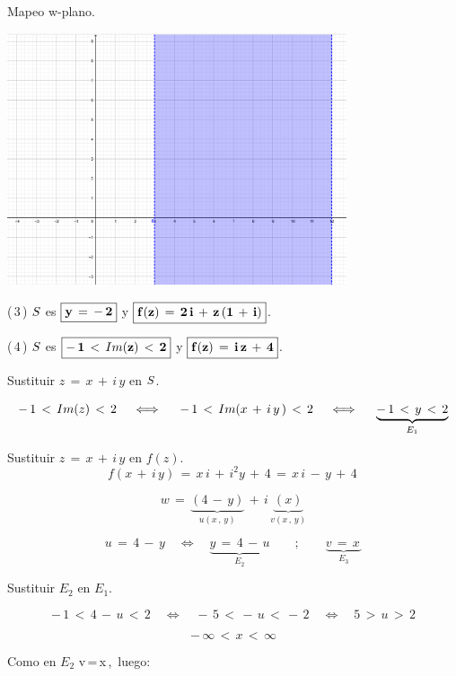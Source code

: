 \documentclass[a4paper,11pt,openany]{book}
\begin{document}
\textcolor{ao(english)}{} Mapeo w-plano.

\begin{center}
     \includegraphics[width=10cm]{Mapeo-Ej-2-w}
\end{center}

\textcolor{ao(english)}{(\,3\,)} $\mathnormal{S}$ es $\boxed{\bf{y\,=\,-\,2}}$ y $\boxed{\bf{f(z)\,=\,2\,i\,+\,z\,(1\,+\,i)}}$.

\textcolor{ao(english)}{(\,4\,)} $\mathnormal{S}$ es $\boxed{\bf{-\,1\,<\,\mathnormal{Im}(z)\,<\,2}}$ y $\boxed{\bf{f(z)\,=\,i\,z\,+\,4}}$.


\textcolor{ao(english)}{} Sustituir $z\,=\,x\,+\,i\,y$ en $\mathnormal{S}$.

$$-\,1\,<\,\mathnormal{Im}(z)\,<\,2 \quad\iff\quad\, -\,1\,<\,\mathnormal{Im}(x\,+\,i\,y\,)\,<\,2 \quad\iff\quad\, \underbrace{ -\,1\,<\,y\,<\,2 }_{E_{1}}$$

\textcolor{ao(english)}{} Sustituir $z\,=\,x\,+\,i\,y$ en $f(z)$.\\

$$f(x\,+\,i\,y)\,=\,x\,i\,+\,i^{2}y\,+\,4\,=\,x\,i\,-\,y\,+\,4\,$$

$$w\,=\,\underbrace{(4\,-\,y)}_{u(x\,,\,y)}\,+\,i\,\underbrace{(x)}_{v(x\,,\,y)}$$

$$u\,=\,4\,-\,y\quad\iff\quad \underbrace{y\,=\,4\,-\,u}_{E_{2}} \qquad;\qquad \underbrace{v\,=\,x\,}_{E_{3}}$$

\textcolor{ao(english)}{} Sustituir $E_{2}$ en $E_{1}$.

$$-\,1\,<\,4\,-\,u\,<\,2 \quad\iff\quad -\,5\,<\,-\,u\,<\,-\,2 \quad\iff\quad 5\,>\,u\,>\,2$$

$$-\,\infty\,<\,x\,<\,\infty$$

\textcolor{ao(english)}{} Como en $E_{2}$ v\,=\,x\,,\, luego:
\end{document}
